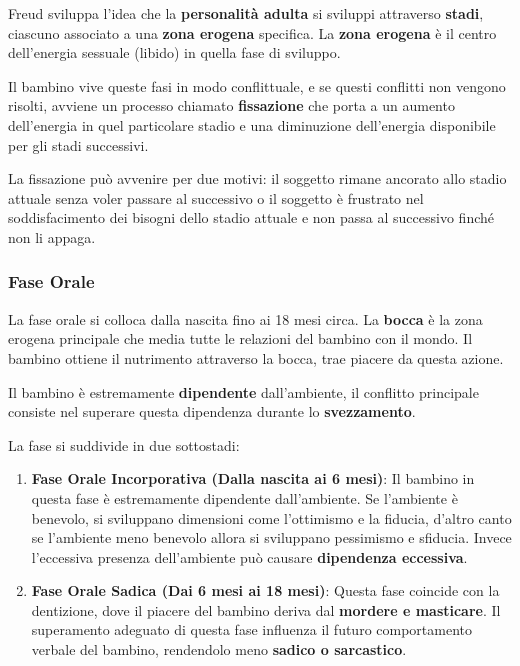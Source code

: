 \documentclass{subfiles}
\begin{document}
Freud sviluppa l'idea che la \textbf{personalità adulta} si sviluppi attraverso 
\textbf{stadi}, ciascuno associato a una \textbf{zona erogena} specifica. 
La \textbf{zona erogena} è il centro dell'energia sessuale (libido) in quella fase di sviluppo.

Il bambino vive queste fasi in modo conflittuale, e se questi conflitti non vengono 
risolti, avviene un processo chiamato \textbf{fissazione} che porta a un aumento dell'energia 
in quel particolare stadio e una diminuzione dell'energia disponibile per gli stadi successivi.

La fissazione può avvenire per due motivi: il soggetto rimane ancorato allo stadio attuale 
senza voler passare al successivo o il soggetto è frustrato nel soddisfacimento dei bisogni 
dello stadio attuale e non passa al successivo finché non li appaga.\\

\subsubsection{Fase Orale}
La fase orale si colloca dalla nascita fino ai 18 mesi circa. La \textbf{bocca} è la zona 
erogena principale che media tutte le relazioni del bambino con il mondo. Il bambino ottiene 
il nutrimento attraverso la bocca, trae piacere da questa azione.

Il bambino è estremamente \textbf{dipendente} dall'ambiente, il conflitto principale consiste 
nel superare questa dipendenza durante lo \textbf{svezzamento}.

La fase si suddivide in due sottostadi: 
\begin{enumerate}
    \item \textbf{Fase Orale Incorporativa (Dalla nascita ai 6 mesi)}: Il bambino in questa fase 
    è estremamente dipendente dall'ambiente. 
    Se l'ambiente è benevolo, si sviluppano dimensioni come l'ottimismo e la fiducia, d'altro 
    canto se l'ambiente meno benevolo allora si sviluppano pessimismo e sfiducia. 
    Invece l'eccessiva presenza dell'ambiente può causare \textbf{dipendenza eccessiva}.

    \item \textbf{Fase Orale Sadica (Dai 6 mesi ai 18 mesi)}: Questa fase coincide con la 
    dentizione, dove il piacere del bambino deriva dal \textbf{mordere e masticare}. 
    Il superamento adeguato di questa fase influenza il futuro comportamento verbale del 
    bambino, rendendolo meno \textbf{sadico o sarcastico}.
\end{enumerate}
\end{document}
